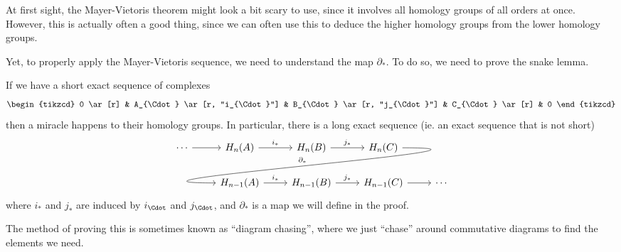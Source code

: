 \documentclass[a4paper]{article}
\begin{document}
At first sight, the Mayer-Vietoris theorem might look a bit scary to use, since it involves all homology groups of all orders at once. However, this is actually often a good thing, since we can often use this to deduce the higher homology groups from the lower homology groups.

Yet, to properly apply the Mayer-Vietoris sequence, we need to understand the map $\partial_*$. To do so, we need to prove the snake lemma.
\begin{thm}
  If we have a short exact sequence of complexes
  \[
    \begin{tikzcd}
      0 \ar[r] & A_{\Cdot} \ar [r, "i_{\Cdot}"] & B_{\Cdot} \ar [r, "j_{\Cdot}"] & C_{\Cdot} \ar[r] & 0
    \end{tikzcd}
  \]
  then a miracle happens to their homology groups. In particular, there is a long exact sequence (ie. an exact sequence that is not short)
  \[
    \begin{tikzcd}
      \cdots \ar [r] & H_n(A) \ar[r, "i_*"] & H_n(B) \ar[r, "j_*"] & H_n(C) \ar[out=0, in=180, looseness=2, overlay, dll, "\partial_*"']\\
      & H_{n - 1}(A) \ar[r, "i_*"] & H_{n - 1}(B) \ar[r, "j_*"] & H_{n - 1}(C) \ar [r] & \cdots
    \end{tikzcd}
  \]
  where $i_*$ and $j_*$ are induced by $i_{\Cdot}$ and $j_{\Cdot}$, and $\partial_*$ is a map we will define in the proof.
\end{thm}
The method of proving this is sometimes known as ``diagram chasing'', where we just ``chase'' around commutative diagrams to find the elements we need.
\end{document}
